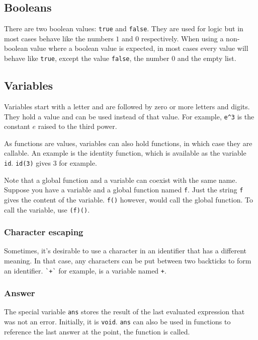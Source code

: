 \documentclass[10pt]{article}
\begin{document}
    \subsection{Booleans}\label{subsec:booleans}
    There are two boolean values: \verb|true| and \verb|false|.
    They are used for logic but in most cases behave like the numbers $ 1 $ and $ 0 $ respectively.
    When using a non-boolean value where a boolean value is expected, in most cases every value will behave like \verb|true|, except the value \verb|false|, the number $ 0 $ and the empty list.
    
    \subsection{Variables}\label{subsec:variables}
    Variables start with a letter and are followed by zero or more letters and digits.
    They hold a value and can be used instead of that value.
    For example, \verb|e^3| is the constant $ e $ raised to the third power.
    
    As functions are values, variables can also hold functions, in which case they are callable.
    An example is the identity function, which is available as the variable \verb|id|.
    \verb|id(3)| gives $ 3 $ for example.
    
    Note that a global function and a variable can coexist with the same name.
    Suppose you have a variable and a global function named \verb|f|.
    Just the string \verb|f| gives the content of the variable.
    \verb|f()| however, would call the global function.
    To call the variable, use \verb|(f)()|.
    
    \subsubsection{Character escaping}
    Sometimes, it's desirable to use a character in an identifier that has a different meaning.
    In that case, any characters can be put between two backticks to form an identifier.
    \verb|`+`| for example, is a variable named \verb|+|.
    
    \subsubsection{Answer}
    The special variable \verb|ans| stores the result of the last evaluated expression that was not an error.
    Initially, it is \verb|void|.
    \verb|ans| can also be used in functions to reference the last answer at the point, the function is called.
    
\end{document}
